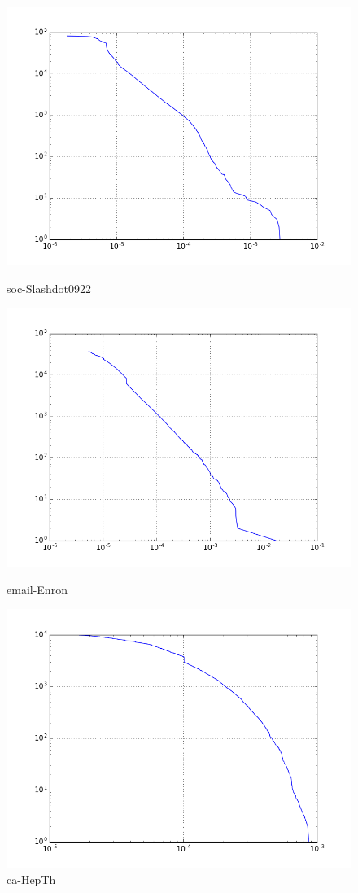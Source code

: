 \begin{figure}[H]
  \includegraphics[width=\linewidth]{img/slashDot09/pagerank_ccdf.png}
  \caption*{soc-Slashdot0922}
\endminipage\hfill
{}
  \includegraphics[width=\linewidth]{img/email/pagerank_ccdf.png}
  \caption*{email-Enron}
\endminipage\hfill
{}
  \includegraphics[width=\linewidth]{img/ca-HepTh/pagerank_ccdf.png}
  \caption*{ca-HepTh}
\endminipage
\end{figure}
